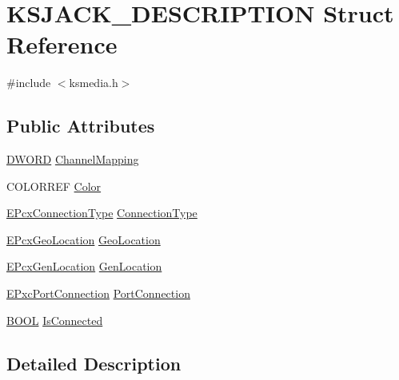 \hypertarget{struct_k_s_j_a_c_k___d_e_s_c_r_i_p_t_i_o_n}{}\section{K\+S\+J\+A\+C\+K\+\_\+\+D\+E\+S\+C\+R\+I\+P\+T\+I\+ON Struct Reference}
\label{struct_k_s_j_a_c_k___d_e_s_c_r_i_p_t_i_o_n}


{\ttfamily \#include $<$ksmedia.\+h$>$}

\subsection*{Public Attributes}
\begin{DoxyCompactItemize}
\item 
\hyperlink{mapinls_8h_ad342ac907eb044443153a22f964bf0af}{D\+W\+O\+RD} \hyperlink{struct_k_s_j_a_c_k___d_e_s_c_r_i_p_t_i_o_n_aa1e44668e22712023045dbff11a5e5fe}{Channel\+Mapping}
\item 
C\+O\+L\+O\+R\+R\+EF \hyperlink{struct_k_s_j_a_c_k___d_e_s_c_r_i_p_t_i_o_n_aa843c17518cd95420e28177647548e11}{Color}
\item 
\hyperlink{ksmedia_8h_afdb69df12579db9b3a98e37df243c03a}{E\+Pcx\+Connection\+Type} \hyperlink{struct_k_s_j_a_c_k___d_e_s_c_r_i_p_t_i_o_n_a4912c3ca11ce94f3b88606dbc346d711}{Connection\+Type}
\item 
\hyperlink{ksmedia_8h_ac4fad76166b5421c84e297adebed1339}{E\+Pcx\+Geo\+Location} \hyperlink{struct_k_s_j_a_c_k___d_e_s_c_r_i_p_t_i_o_n_aa9295786f7e992d8f4db02d43bbdfc17}{Geo\+Location}
\item 
\hyperlink{ksmedia_8h_a9cd07cae0b9790b8d3a939abc010481a}{E\+Pcx\+Gen\+Location} \hyperlink{struct_k_s_j_a_c_k___d_e_s_c_r_i_p_t_i_o_n_ae906bb4ae773b628f2906d16b0daa2b3}{Gen\+Location}
\item 
\hyperlink{ksmedia_8h_ab7563f14bc668f277cd1664d666d52a5}{E\+Pxc\+Port\+Connection} \hyperlink{struct_k_s_j_a_c_k___d_e_s_c_r_i_p_t_i_o_n_a8404a8021c3738727574ab02da9b70b2}{Port\+Connection}
\item 
\hyperlink{nfilterkit_8h_a3be13892ae7076009afcf121347dd319}{B\+O\+OL} \hyperlink{struct_k_s_j_a_c_k___d_e_s_c_r_i_p_t_i_o_n_a0840c033bb5af29e583a0edb0bbacc35}{Is\+Connected}
\end{DoxyCompactItemize}


\subsection{Detailed Description}


